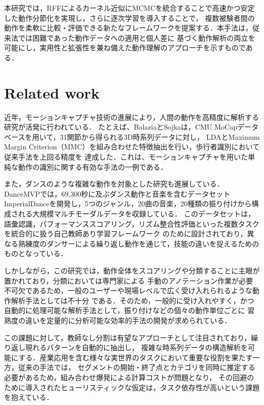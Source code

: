 \documentclass[conference]{IEEEtran}
\begin{document}
本研究では，RFFによるカーネル近似にMCMCを統合することで高速かつ安定した動作分節化を実現し，さらに逐次学習を導入することで，
複数被験者間の動作を柔軟に比較・評価できる新たなフレームワークを提案する．本手法は，従来法では困難であった動作データへの適用と個人差に
基づく動作解析の両立を可能にし，実用性と拡張性を兼ね備えた動作理解のアプローチを示すものである．

\section{Related work}
近年，モーションキャプチャ技術の進展により，人間の動作を高精度に解析する研究が活発に行われている\cite{Balazia2018, 3DPW2018, Thoker2021, Lam2023, Suo2024, DanceMVP2024}．
たとえば、BalaziaとSojka\cite{Balazia2018}は，CMU MoCapデータベースを用いて，31関節から得られる3D時系列データに対し，
LDAとMaximum Margin Criterion（MMC）を組み合わせた特徴抽出を行い，歩行者識別において従来手法を上回る精度を
達成した．これは、モーションキャプチャを用いた単純な動作の識別に関する有効な手法の一例である．

また，ダンスのような複雑な動作を対象とした研究も進展している．
DanceMVP\cite{DanceMVP2024}では，69,300秒に及ぶダンス動作と音楽を含むデータセット
ImperialDanceを開発し，5つのジャンル，20曲の音楽，20種類の振り付けから構成される大規模マルチモーダルデータを収録している．
このデータセットは，語彙認識，パフォーマンススコアリング，リズム整合性評価といった複数タスクを統合的に扱う自己教師あり学習フレームワーク
のために設計されており，異なる熟練度のダンサーによる繰り返し動作を通じて，技能の違いを捉えるためのものとなっている．

しかしながら，この研究では，動作全体をスコアリングや分類することに主眼が置かれており，分類においては専門家による
手動のアノテーション作業が必要不可欠であるため，一般のユーザーや現場レベルで広く受け入れられるような動作解析手法としては不十分
である．そのため，一般的に受け入れやすく，かつ自動的に処理可能な解析手法として，振り付けなどの個々の動作単位ごとに
習熟度の違いを定量的に分析可能な効率的手法の開発が求められている．

この課題に対して，教師なし分割\cite{Fox2011, Matsubara2014, Sener2018, Bojanowski2014, Huang2016, Richard2017}は有望なアプローチとして注目されており，繰り返し現れるパターンを自動的に抽出し，
複雑な時系列データの構造解析を可能にする．産業応用を含む様々な実世界のタスクにおいて重要な役割を果たす一方，従来の手法では，
セグメントの開始・終了点とカテゴリを同時に推定する必要があるため，組み合わせ爆発による計算コストが問題となり，
その回避のために導入されたヒューリスティックな仮定は，タスク依存性が高いという課題を抱えている．
\end{document}
